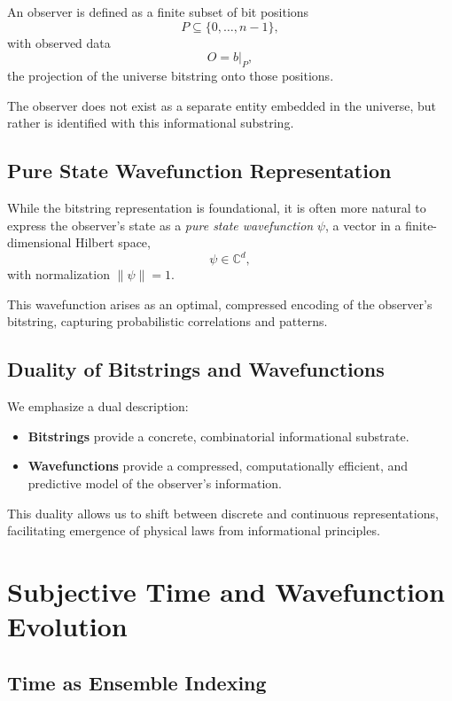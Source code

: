 \documentclass[12pt]{article}
\begin{document}
An observer is defined as a finite subset of bit positions
\[
      P \subseteq \{0, \dots, n-1\},
\]
with observed data
\[
      O = b|_P,
\]
the projection of the universe bitstring onto those positions.

The observer does not exist as a separate entity embedded in the universe, but rather is identified with this informational substring.

\subsection{Pure State Wavefunction Representation}

While the bitstring representation is foundational, it is often more natural to express the observer's state as a \emph{pure state wavefunction} \(\psi\), a vector in a finite-dimensional Hilbert space,
\[
      \psi \in \mathbb{C}^d,
\]
with normalization \(\|\psi\|=1\).

This wavefunction arises as an optimal, compressed encoding of the observer's bitstring, capturing probabilistic correlations and patterns.

\subsection{Duality of Bitstrings and Wavefunctions}

We emphasize a dual description:

\begin{itemize}
      \item \textbf{Bitstrings} provide a concrete, combinatorial informational substrate.
      \item \textbf{Wavefunctions} provide a compressed, computationally efficient, and predictive model of the observer's information.
\end{itemize}

This duality allows us to shift between discrete and continuous representations, facilitating emergence of physical laws from informational principles.

\section{Subjective Time and Wavefunction Evolution}

\subsection{Time as Ensemble Indexing}
\end{document}
